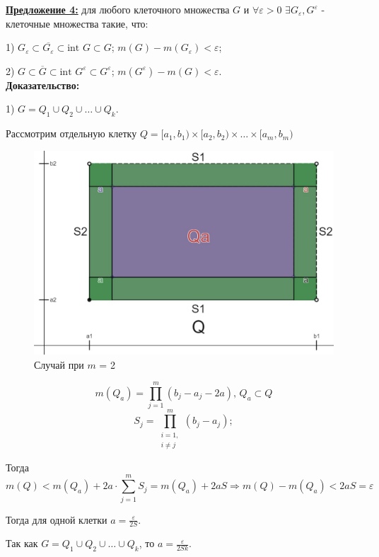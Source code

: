 \documentclass[a4paper,12pt]{article} %
\begin{document}
\underline{\textbf{Предложение 4:}} для любого клеточного множества $G$ и $\forall \varepsilon > 0$ $\exists G_{\varepsilon}, G^{\varepsilon}$ - клеточные множества такие, что:

1) $G_{\varepsilon} \subset \overline{G_{\varepsilon}} \subset \text{int } G \subset G$;\hspace{8mm} $m(G) - m(G_{\varepsilon}) < \varepsilon$;

2) $G \subset \overline{G} \subset \text{int } G^{\varepsilon} \subset G^{\varepsilon}$; \hspace{7mm} $m(G^{\varepsilon}) - m(G) < \varepsilon$.\\

\textbf{Доказательство:}

1) $G = Q_1 \cup Q_2 \cup \ldots \cup Q_k$.

Рассмотрим отдельную клетку $Q = [a_1, b_1) \times [a_2, b_2) \times \ldots \times [a_m, b_m)$

\begin{figure}[h!]
	\centering
	\includegraphics[scale=0.3]{Пред4.jpg}
	\caption{Случай при $m$ = 2}
\end{figure}

\[m(Q_a) = \prod\limits_{j = 1}^m (b_j - a_j - 2a) \text{, }  Q_a \subset Q \]
\[S_j = \prod\limits_{\substack{i = 1,\\ i \neq j}}^m (b_j - a_j);\]

Тогда
\[m(Q) < m(Q_a) + 2a\cdot\sum\limits_{j = 1}^m S_j = m(Q_a) + 2aS \Rightarrow m(Q) - m(Q_a) < 2aS = \varepsilon\]

Тогда для одной клетки $a = \frac{\varepsilon}{2S}$.

Так как $G = Q_1 \cup Q_2 \cup \ldots \cup Q_k$, то $a = \frac{\varepsilon}{2Sk}$.
\end{document}
